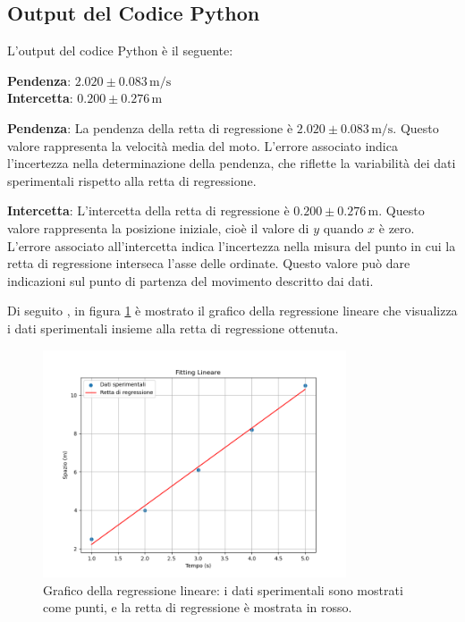 \documentclass[a4paper,12pt]{article}
\begin{document}
\subsection{Output del Codice Python}

L'output del codice Python è il seguente:

\begin{mdframed}[backgroundcolor=lightgray, linecolor=black, linewidth=1pt]
\textbf{Pendenza}: \(2.020 \pm 0.083 \, \si{\meter\per\second}\) \\
\textbf{Intercetta}: \(0.200 \pm 0.276 \, \si{\meter}\)
\end{mdframed}

\textbf{Pendenza}: La pendenza della retta di regressione è \(2.020 \pm 0.083 \, \si{\meter\per\second}\). Questo valore rappresenta la velocità media del moto. L'errore associato indica l'incertezza nella determinazione della pendenza, che riflette la variabilità dei dati sperimentali rispetto alla retta di regressione.

\textbf{Intercetta}: L'intercetta della retta di regressione è \(0.200 \pm 0.276 \, \si{\meter}\). Questo valore rappresenta la posizione iniziale, cioè il valore di \(y\) quando \(x\) è zero. L'errore associato all'intercetta indica l'incertezza nella misura del punto in cui la retta di regressione interseca l'asse delle ordinate. Questo valore può dare indicazioni sul punto di partenza del movimento descritto dai dati.



Di seguito , in figura \ref{fig:regressione_lineare} è mostrato il grafico della regressione lineare che visualizza i dati sperimentali insieme alla retta di regressione ottenuta.

\begin{figure}[h!]
    \centering
    \includegraphics[width=0.8\textwidth]{regressione_lineare.png}
    \caption{Grafico della regressione lineare: i dati sperimentali sono mostrati come punti, e la retta di regressione è mostrata in rosso.}
    \label{fig:regressione_lineare}
\end{figure}
\end{document}
